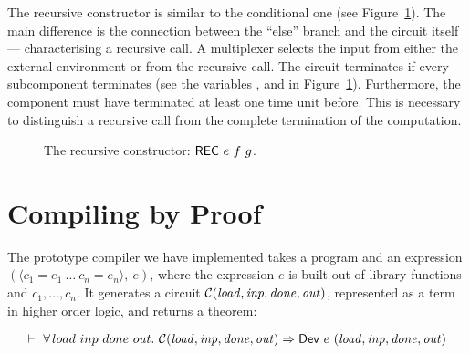 \documentclass{llncs}
\begin{document}
The recursive constructor is similar to the conditional one
(see Figure~\ref{figRec}).
The main difference is the connection between the
``else'' branch and the circuit itself --- characterising a
recursive call. A multiplexer selects the input from either
the external environment or from the recursive call.
The circuit terminates if every subcomponent terminates
(see the variables ,  and 
in Figure~\ref{figRec}). Furthermore, the component 
must have terminated at least one time unit before. This is
necessary to distinguish a recursive call from the
complete termination of the computation.

\begin{figure}[htb]
   \centerline{}
   \caption{\label{figRec}The recursive constructor: $\DEF{REC}\ e\ f\ g$.}
\end{figure}


\section{Compiling by Proof}
\label{secCompilingByProof}


The prototype compiler we have implemented takes a program and an expression $(\langle
c_1=e_1~\ldots~c_n=e_n\rangle,~e)$, where the expression $e$ is built
out of library functions and $c_1,\ldots,c_{n}$. It generates
a circuit ${\cal C}(\mathit{load,inp,done,out})$, represented as a term in higher order logic, 
and returns a theorem:

\vspace*{-2mm}

\[
\begin{array}{l}
\vdash\ \forall \hspace*{0.5mm} load~inp~done~out.~{\cal C}(\mathit{load,inp,done,out}) \Rightarrow \mathsf{Dev}~e~(\mathit{load,inp,done,out})
\end{array}
\]

\vspace*{-2mm}
\end{document}
